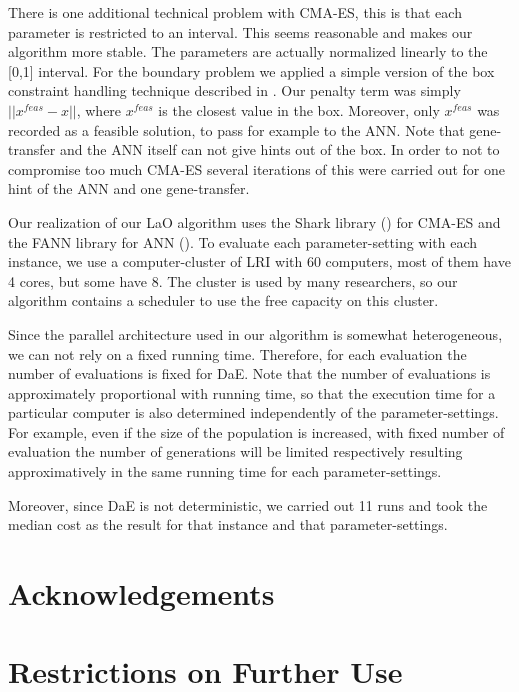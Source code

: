 \documentclass{article}
\begin{document}
There is one additional technical problem with CMA-ES, this is that each parameter is restricted to an interval. This seems reasonable and makes our algorithm more stable. The parameters are actually normalized linearly to the [0,1] interval. For the boundary problem we applied a simple version of the box constraint handling technique described in \cite{hansen2009tec}. Our penalty term was simply \begin{math}||x^{feas}-x|| \end{math}, where \begin{math}x^{feas}\end{math} is the closest value in the box. Moreover, only \begin{math}x^{feas}\end{math} was recorded as a feasible solution, to pass for example to the ANN. Note that gene-transfer and the ANN itself can not give hints out of the box. In order to not to compromise too much CMA-ES several iterations of this were carried out for one hint of the ANN and one gene-transfer.

Our realization of our LaO algorithm uses the Shark library (\cite{shark08}) for CMA-ES and the FANN library for ANN (\cite{nissen}). To evaluate each parameter-setting with each instance, we use a computer-cluster of LRI with 60 computers, most of them have 4 cores, but some have 8. The cluster is used by many researchers, so our algorithm contains a scheduler to use the free capacity on this cluster.

Since the parallel architecture used in our algorithm is somewhat heterogeneous, we can not rely on a fixed running time. Therefore, for each evaluation the number of evaluations is fixed for DaE. Note that the number of evaluations is approximately proportional with running time, so that the execution time for a particular computer is also determined independently of the parameter-settings. For example, even if the size of the population is increased, with fixed number of evaluation the number of generations will be limited respectively resulting approximatively in the same running time for each parameter-settings. 

Moreover, since DaE is not deterministic, we carried out 11 runs and took the median cost as the result for that instance and that parameter-settings.

\section*{Acknowledgements}

\section*{Restrictions on Further Use}



\end{document}
